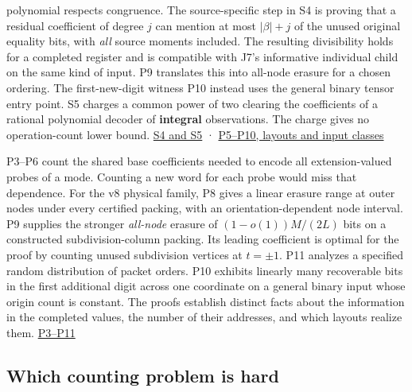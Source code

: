 \documentclass[
  11pt,
]{article}
\begin{document}
\begin{itemize}
  polynomial respects congruence. The source-specific step in S4 is
  proving that a residual coefficient of degree \(j\) can mention at
  most \(|\beta|+j\) of the unused original equality bits, with
  \emph{all} source moments included. The resulting divisibility holds
  for a completed register and is compatible with J7's informative
  individual child on the same kind of input. P9 translates this into
  all-node erasure for a chosen ordering. The first-new-digit witness
  P10 instead uses the general binary tensor entry point. S5 charges a
  common power of two clearing the coefficients of a rational polynomial
  decoder of \textbf{integral} observations. The charge gives no
  operation-count lower bound.
  \hyperref[v9-erasure-denominators-and-computation]{S4 and S5} ·
  \hyperref[v9-what-unused-equality-columns-force]{P5--P10, layouts and
  input classes}
\end{itemize}

P3--P6 count the shared base coefficients needed to encode all
extension-valued probes of a mode. Counting a new word for each probe
would miss that dependence. For the v8 physical family, P8 gives a
linear erasure range at outer nodes under every certified packing, with
an orientation-dependent node interval. P9 supplies the stronger
\emph{all-node} erasure of \((1-o(1))M/(2L)\) bits on a constructed
subdivision-column packing. Its leading coefficient is optimal for the
proof by counting unused subdivision vertices at \(t=\pm1\). P11
analyzes a specified random distribution of packet orders. P10 exhibits
linearly many recoverable bits in the first additional digit across one
coordinate on a general binary input whose origin count is constant. The
proofs establish distinct facts about the information in the completed
values, the number of their addresses, and which layouts realize them.
\hyperref[v9-section-precision-frontier]{P3--P11}

\subsection{Which counting problem is
hard}\label{v9-which-counting-problem-is-hard}
\end{document}

